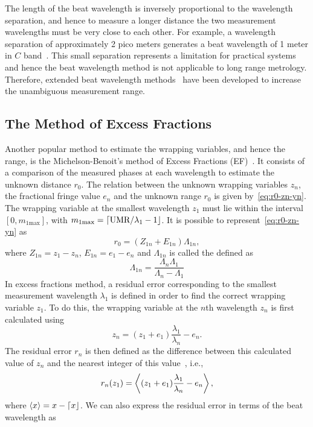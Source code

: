 The length of the beat wavelength is inversely proportional to the wavelength separation, and hence to measure a longer distance the two measurement wavelengths must be very close to each other. For example, a wavelength separation of approximately 2 pico meters generates a beat wavelength of 1 meter in $C$ band~\cite{Falaggis:09}. This small separation represents a limitation for practical systems and hence the beat wavelength method is not applicable to long range metrology. Therefore, extended beat wavelength methods~\cite{deGroot_94, Falaggis:09, Towers2011} have been developed to increase the unambiguous measurement range. 


\subsection{The Method of Excess Fractions}
Another popular method to estimate the wrapping variables, and hence the range, is the Michelson-Benoit's method of Excess Fractions (EF)~\cite{Falaggis_excess_fractions_2011}. It consists of a comparison of the measured phases at each wavelength to estimate the unknown distance $r_0$. The relation between the unknown wrapping variables $z_n$, the fractional fringe value $e_n$ and the unknown range $r_0$ is given by~\ref{eq:r0-zn-yn}. The wrapping variable at the smallest wavelength $z_1$ must lie within the interval $[0, m_{1\text{max}}]$, with $m_{1\text{max}} = {\left\lceil \text{UMR}/\lambda_1 -1 \right\rfloor}$. It is possible to represent~\ref{eq:r0-zn-yn} as
\[
r_0 = (Z_{1n} + E_{1n})\Lambda_{1n},
\]
where $Z_{1n} = z_1 - z_n$, $E_{1n}=e_{1} -e_{n}$ and $\Lambda_{1n}$ is called the  defined as
\[
\Lambda_{1n} = \dfrac{\Lambda_n\Lambda_1}{\Lambda_n - \Lambda_1}
\]
In excess fractions method, a residual error corresponding to the smallest measurement wavelength $\lambda_1$ is defined in order to find the correct wrapping variable $z_1$. To do this, the wrapping variable at the $n$th wavelength $z_n$ is first calculated using~\cite{Falaggis_excess_fractions_2011}
\[
z_n = (z_1 + e_1)\dfrac{\lambda_1}{\lambda_n} - e_n.
\]
The residual error $r_n$ is then defined as the difference between this calculated value of $z_n$ and the nearest integer of this value~\cite{Falaggis_excess_fractions_2011}, i.e.,
\begin{equation}\label{eq:residual-error-1}
r_n(z_1) = \left\langle (z_1 + e_1)\dfrac{\lambda_1}{\lambda_n} - e_n \right\rangle,
\end{equation}
where $\left\langle x \right\rangle=x - {\left\lceil x \right\rfloor}$. We can also express the residual error in terms of the beat wavelength as 
